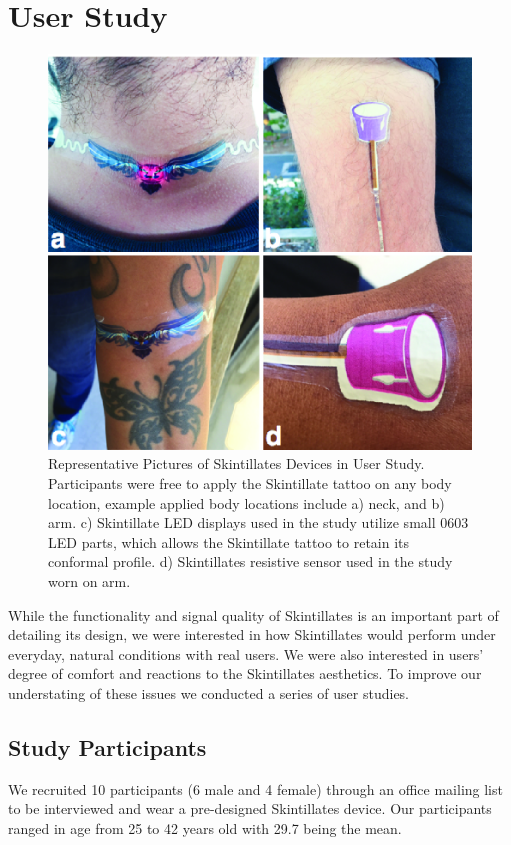 \documentclass{sigchi}
\begin{document}
\section {User Study}
\begin{figure} [b!]
\centering
\includegraphics[width=1\columnwidth]{figures/Figure11}
\caption{Representative Pictures of Skintillates Devices in User Study. Participants were free to apply the Skintillate tattoo on any body location, example applied body locations include a) neck, and b) arm. c) Skintillate LED displays used in the study utilize small 0603 LED parts, which allows the Skintillate tattoo to retain its conformal profile. d) Skintillates resistive sensor used in the study worn on arm. }
\vspace{-8pt}
\label{fig:userstudy}
\end{figure}
While the functionality and signal quality of Skintillates is an important part of detailing its design, we were interested in how Skintillates would perform under everyday, natural conditions with real users.  We were also interested in users’ degree of comfort and reactions to the Skintillates aesthetics.  To improve our understating of these issues we conducted a series of user studies.
\subsection {Study Participants}
We recruited 10 participants (6 male and 4 female) through an office mailing list to be interviewed and wear a pre-designed Skintillates device.  Our participants ranged in age from 25 to 42 years old with 29.7 being the mean.  
\end{document}
